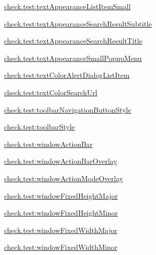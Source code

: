 {\ttfamily \hyperlink{classcheck_1_1test_1_1_r_1_1styleable_abe557b2f9da24355df498eac97be2c53}{check.\+test\+:text\+Appearance\+List\+Item\+Small}}

{\ttfamily \hyperlink{classcheck_1_1test_1_1_r_1_1styleable_a1d39c6b5da48087c8f55a027e4050139}{check.\+test\+:text\+Appearance\+Search\+Result\+Subtitle}}

{\ttfamily \hyperlink{classcheck_1_1test_1_1_r_1_1styleable_aad7da0b4a2302f6cd5981784f6507c2d}{check.\+test\+:text\+Appearance\+Search\+Result\+Title}}

{\ttfamily \hyperlink{classcheck_1_1test_1_1_r_1_1styleable_a5d74a42ce30244146c66202e8a63600e}{check.\+test\+:text\+Appearance\+Small\+Popup\+Menu}}

{\ttfamily \hyperlink{classcheck_1_1test_1_1_r_1_1styleable_a1c80e17e0c7244efe703fdaec5710c66}{check.\+test\+:text\+Color\+Alert\+Dialog\+List\+Item}}

{\ttfamily \hyperlink{classcheck_1_1test_1_1_r_1_1styleable_ac9bde1fe29dd51a5aa9486cce5dc77cd}{check.\+test\+:text\+Color\+Search\+Url}}

{\ttfamily \hyperlink{classcheck_1_1test_1_1_r_1_1styleable_a17c17271f93cd157c12fec0dd05f41e2}{check.\+test\+:toolbar\+Navigation\+Button\+Style}}

{\ttfamily \hyperlink{classcheck_1_1test_1_1_r_1_1styleable_a3e0a6d9c5645dc0e8bc6e32efbf36b28}{check.\+test\+:toolbar\+Style}}

{\ttfamily \hyperlink{classcheck_1_1test_1_1_r_1_1styleable_adc8b4e64798d8c55e475a6440a5c6aac}{check.\+test\+:window\+Action\+Bar}}

{\ttfamily \hyperlink{classcheck_1_1test_1_1_r_1_1styleable_adc29b18d7459f89f6028a65608a1e6c8}{check.\+test\+:window\+Action\+Bar\+Overlay}}

{\ttfamily \hyperlink{classcheck_1_1test_1_1_r_1_1styleable_a5abe584f47941f3243c037bca83f20fd}{check.\+test\+:window\+Action\+Mode\+Overlay}}

{\ttfamily \hyperlink{classcheck_1_1test_1_1_r_1_1styleable_a9e8a42067e25b6c873f7293e9bee1343}{check.\+test\+:window\+Fixed\+Height\+Major}}

{\ttfamily \hyperlink{classcheck_1_1test_1_1_r_1_1styleable_a8aa80c12e9d59fb6879aaf0273377731}{check.\+test\+:window\+Fixed\+Height\+Minor}}

{\ttfamily \hyperlink{classcheck_1_1test_1_1_r_1_1styleable_aba8175a4427847a30a88e449000d7412}{check.\+test\+:window\+Fixed\+Width\+Major}}

{\ttfamily \hyperlink{classcheck_1_1test_1_1_r_1_1styleable_ad9f0c51f93dc1efedfd42524c8d2acea}{check.\+test\+:window\+Fixed\+Width\+Minor}}

